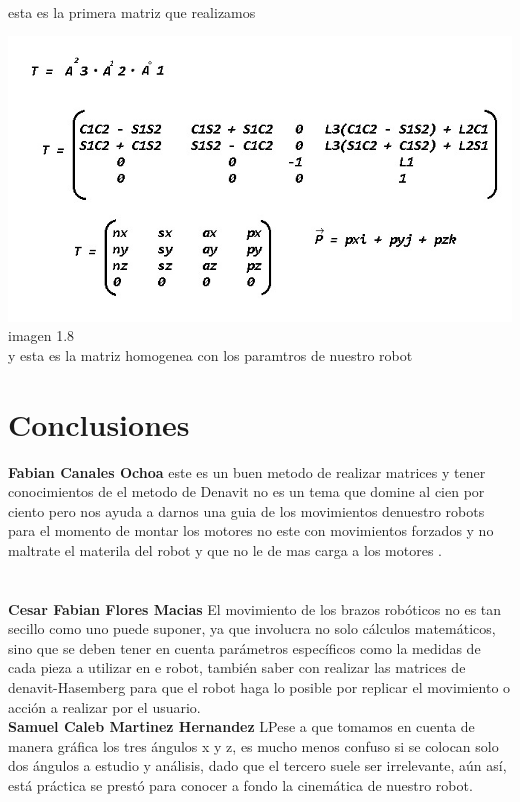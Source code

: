 \documentclass[10pt,a4paper]{article}
\begin{document}
{{\begin{center}
\\ esta es la primera matriz que realizamos
\end{center}
\begin{center}
\includegraphics[scale=0.5]{imagenes/G.png} imagen 1.8 
\\ y esta es la matriz homogenea con los paramtros de nuestro robot
\end{center}

\section{{\Huge Conclusiones }}
{\large \huge\textbf{ Fabian Canales Ochoa}  este es un buen metodo de realizar matrices y tener conocimientos de el metodo de Denavit no es un tema que domine al cien por ciento pero nos ayuda a darnos una guia de los movimientos denuestro robots para el momento de montar los motores no este con movimientos forzados y no maltrate el materila del robot y que no le de mas carga a los motores .\\ \\ \\
{\large \huge\textbf{ Cesar Fabian Flores Macias}
El movimiento de los brazos robóticos no es tan secillo como uno puede suponer, ya que involucra no solo cálculos matemáticos, sino que se deben tener en cuenta parámetros específicos como la medidas de cada pieza a utilizar en e robot, también saber con realizar las matrices de denavit-Hasemberg para que el robot haga lo posible por replicar el movimiento o acción a realizar por el usuario.\\ 

{\large \huge\textbf{ Samuel Caleb Martinez Hernandez}	
LPese a que tomamos en cuenta de manera gráfica los tres ángulos x y z, es mucho menos confuso si se colocan solo dos ángulos a estudio y análisis, dado que el tercero suele ser irrelevante, aún así, está práctica se prestó para conocer a fondo la cinemática de nuestro robot.\\ 

}}}}}
\end{document}

